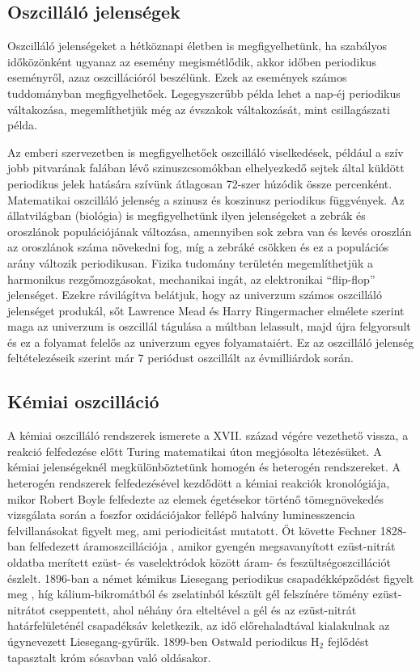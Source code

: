 \subsection{Oszcilláló jelenségek}
Oszcilláló jelenségeket a hétköznapi életben is megfigyelhetünk, ha szabályos időközönként ugyanaz az esemény megismétlődik, akkor időben periodikus eseményről, azaz oszcillációról beszélünk. Ezek az események számos tuddományban megfigyelhetőek. Legegyszerűbb példa lehet a nap-éj periodikus váltakozása, megemlíthetjük még az évszakok váltakozását, mint csillagászati példa.

Az emberi szervezetben is megfigyelhetőek oszcilláló viselkedések, például a szív jobb pitvarának falában lévő szinuszcsomókban elhelyezkedő sejtek által küldött periodikus jelek hatására  szívünk átlagosan 72-szer húzódik össze percenként. Matematikai oszcilláló jelenség a szinusz és koszinusz periodikus függvények. Az állatvilágban (biológia) is megfigyelhetünk ilyen jelenségeket a zebrák és oroszlánok populációjának változása, amennyiben sok zebra van és kevés oroszlán az oroszlánok száma növekedni fog, míg a zebráké csökken és ez a populációs arány változik periodikusan. Fizika tudomány területén megemlíthetjük a harmonikus rezgőmozgásokat, mechanikai ingát,  az elektronikai “flip-flop” jelenséget. Ezekre rávilágítva belátjuk, hogy az univerzum számos oszcilláló jelenséget produkál, sőt Lawrence Mead és Harry Ringermacher elmélete \cite{ringermacher2017strong}  szerint maga az univerzum is oszcillál tágulása a múltban lelassult, majd újra felgyorsult és ez a folyamat felelős az univerzum egyes folyamataiért. Ez az oszcilláló jelenség feltételezéseik szerint már 7 periódust oszcillált az évmilliárdok során.

\subsection{Kémiai oszcilláció}
A kémiai oszcilláló rendszerek ismerete a XVII. század végére vezethető vissza, a reakció felfedezése előtt Turing matematikai úton megjósolta létezésüket.\cite{turing1952chemical} A kémiai jelenségeknél megkülönböztetünk homogén és heterogén rendszereket. A heterogén rendszerek felfedezésével kezdődött a kémiai reakciók kronológiája, mikor Robert Boyle \cite{harvey1957history} felfedezte az elemek égetésekor történő tömegnövekedés vizsgálata során a foszfor oxidációjakor fellépő halvány luminesszencia felvillanásokat figyelt meg, ami periodicitást mutatott. Őt követte  Fechner 1828-ban felfedezett áramoszcillációja \cite{fechner1828schweigg}, amikor gyengén megsavanyított ezüst-nitrát oldatba merített ezüst- és vaselektródok között áram- és feszültségoszcillációt észlelt. 1896-ban a német kémikus Liesegang periodikus csapadékképződést figyelt meg \cite{liesegang1896ueber}, híg kálium-bikromátból és zselatinból készült gél felszínére tömény ezüst-nitrátot cseppentett, ahol néhány óra elteltével a gél és az ezüst-nitrát határfelületénél csapadéksáv keletkezik, az idő előrehaladtával kialakulnak az úgynevezett Liesegang-gyűrűk. 1899-ben Ostwald \cite{ostwald1899jacobus} periodikus H$_2$ fejlődést tapasztalt króm sósavban való oldásakor.


